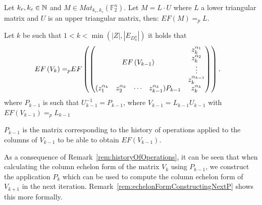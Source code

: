 \documentclass[11pt]{llncs}
\begin{document}
\begin{remark}\label{rem:rowEchelonForm}
    Let $k_r, k_c \in \mathbb{N}$ and $M\in Mat_{k_r,k_c}(\mathbb{F}_2^n)$. Let $M = L\cdot U$ where $L$ a lower triangular matrix and $U$ is an upper triangular matrix, then: $EF(M) =_p L$.
\end{remark}

\begin{proposition}\label{prop:rowEchelonForm}
    Let $k$ be such that $1<k< \min{\left(|Z|,|E_{D_n^n}|\right)}$ it holds that
    \begin{align*}
        EF\left(V_{k}\right) =_p & EF
        \begin{pmatrix}
        \begin{pmatrix}
            \multicolumn{4}{c}{\multirow{4}{*}{$EF\left(V_{k-1}\right)$}} & z_k^{\alpha_1}\\
            & & & & z_k^{\alpha_2}\\
            & & & & \vdots\\
            & & & & z_{k}^{\alpha_{k-1}}\\
            (z_1^{\alpha_{k}} & z_2^{\alpha_{k}}& \cdots & z_{k-1}^{\alpha_{k}})P_{k-1} & z_{k}^{\alpha_k}
        \end{pmatrix}
        \end{pmatrix}.
    \end{align*}
    where $P_{k-1}$ is such that $U_{k-1}^{-1} = P_{k-1}$, where $V_{k-1} = L_{k-1}U_{k-1}$ with $EF(V_{k-1})=_p L_{k-1}$
\end{proposition}


\begin{remark}\label{rem:historyOfOperations}
    $P_{k-1}$ is the matrix corresponding to the history of operations applied to the columns of $V_{k-1}$ to be able to obtain $EF\left(V_{k-1}\right)$.
\end{remark}

As a consequence of Remark~\ref{rem:historyOfOperations}, it can be seen that when calculating the column echelon form of the matrix $V_k$ using $P_{k-1}$, we construct the application $P_k$ which can be used to compute the column echelon form of $V_{k+1}$ in the next iteration. Remark~\ref{rem:echelonFormConstructingNextP} shows this more formally.
\end{document}
